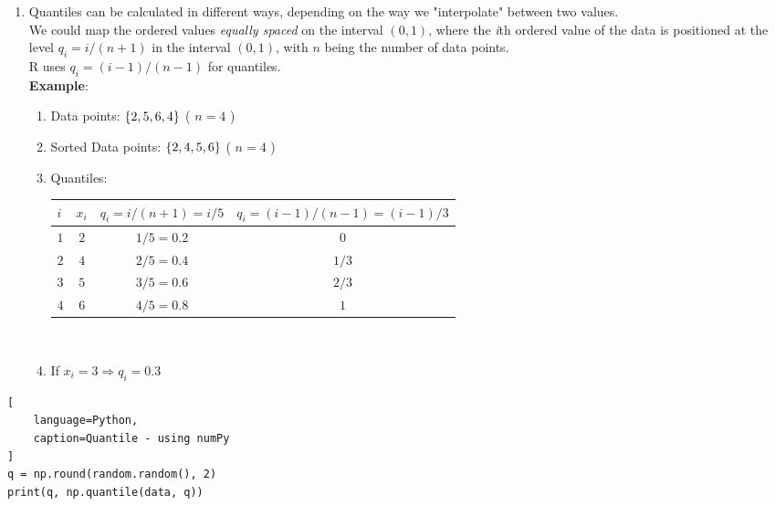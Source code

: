 \begin{enumerate}
    \item Quantiles can be calculated in different ways, depending on the way we "interpolate" between two values. \hfill \cite{statistics/book/Statistics-for-Data-Scientists/Maurits-Kaptein} \\
    We could map the ordered values \textit{equally spaced} on the interval $(0, 1)$, where the \textit{i}th ordered value of the data is positioned at the level $q_i = {i}/{(n + 1)}$ in the interval $(0, 1)$, with $n$ being the number of data points. \hfill \cite{statistics/book/Statistics-for-Data-Scientists/Maurits-Kaptein} \\
    R uses $q_i = (i - 1)/(n - 1)$ for quantiles. \hfill \cite{statistics/book/Statistics-for-Data-Scientists/Maurits-Kaptein} \\
    \textbf{Example}: \hfill \cite{statistics/book/Statistics-for-Data-Scientists/Maurits-Kaptein}
    \begin{enumerate}
        \item Data points: $\left\{2, 5, 6, 4\right\}$ ( $n=4$ )
        \item Sorted Data points: $\left\{2, 4, 5, 6\right\}$ ( $n=4$ )
        \item Quantiles:\\[0.2cm]
        \begin{tabular}{|l|c|c|c|}
            \hline
            $i$ & $x_i$ & $q_i = i/(n+1) = i/5$ & $q_i = (i-1)/(n-1) = (i-1)/3$ \\ [0.1cm]
            \hline
            $1$ & $2$ & $1/5 = 0.2$ & $0$ \\
            $2$ & $4$ & $2/5 = 0.4$ & $1/3$ \\
            $3$ & $5$ & $3/5 = 0.6$ & $2/3$ \\
            $4$ & $6$ & $4/5 = 0.8$ & $1$ \\
            \hline
        \end{tabular}\\

        \item If $x_i = 3 \Rightarrow q_i = 0.3$
    \end{enumerate}
\end{enumerate}

\begin{lstlisting}[
    language=Python, 
    caption=Quantile - using numPy
]
q = np.round(random.random(), 2)
print(q, np.quantile(data, q))
\end{lstlisting}



